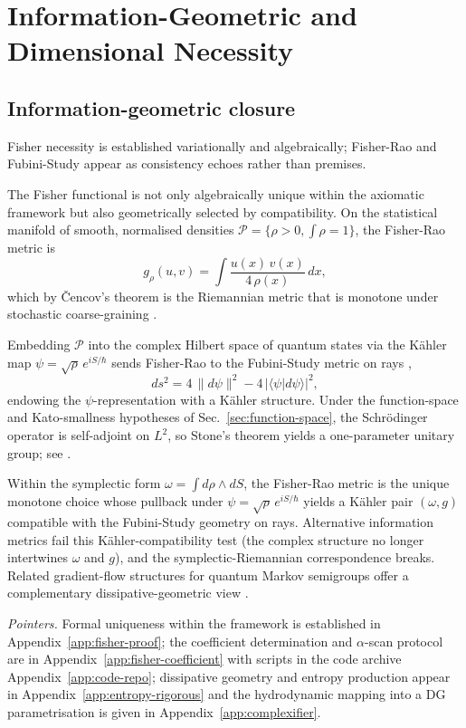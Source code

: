 \documentclass[11pt,a4paper]{article}
\numberwithin{equation}{section}
\theoremstyle{thmcompact}
\theoremstyle{remark}
\begin{document}
\section{Information-Geometric and Dimensional Necessity}
	
\subsection{Information-geometric closure}

Fisher necessity is established variationally and algebraically; Fisher-Rao and Fubini-Study appear as consistency echoes rather than premises.

The Fisher functional is not only algebraically unique within the axiomatic framework but also geometrically selected by compatibility.
On the statistical manifold of smooth, normalised densities $\mathcal{P}=\{\rho>0,\int\rho=1\}$, the Fisher-Rao metric is
\[
g_{\rho}(u,v)=\int \frac{u(x)\,v(x)}{4\,\rho(x)}\,dx,
\]
which by Čencov’s theorem is the Riemannian metric that is monotone under stochastic coarse-graining \cite{cencov1982}.

Embedding $\mathcal{P}$ into the complex Hilbert space of quantum states via the Kähler map $\psi=\sqrt{\rho}\,e^{iS/\hbar}$ sends Fisher-Rao to the Fubini-Study metric on rays \cite{kibble1979,anandan1990},
\[
ds^2=4\,\|d\psi\|^2-4\,|\langle\psi|d\psi\rangle|^2,
\]
endowing the $\psi$-representation with a Kähler structure. Under the function-space and Kato-smallness hypotheses of Sec.~\ref{sec:function-space}, the Schrödinger operator is self-adjoint on $L^{2}$, so Stone’s theorem yields a one-parameter unitary group; see \cite{kato1995}.


Within the symplectic form $\omega=\int d\rho\wedge dS$, the Fisher-Rao metric is the unique monotone choice whose pullback under $\psi=\sqrt\rho\,e^{iS/\hbar}$ yields a Kähler pair $(\omega,g)$ compatible with the Fubini-Study geometry on rays. Alternative information metrics fail this Kähler-compatibility test (the complex structure no longer intertwines $\omega$ and $g$), and the symplectic-Riemannian correspondence breaks.
Related gradient-flow structures for quantum Markov semigroups offer a complementary dissipative-geometric view \cite{carlen2017}.

\emph{Pointers.}
Formal uniqueness within the framework is established in Appendix~\ref{app:fisher-proof}; the coefficient determination and $\alpha$-scan protocol are in Appendix~\ref{app:fisher-coefficient} with scripts in the code archive Appendix~\ref{app:code-repo}; dissipative geometry and entropy production appear in Appendix~\ref{app:entropy-rigorous} and the hydrodynamic mapping into a DG parametrisation is given in Appendix~\ref{app:complexifier}.
\end{document}
